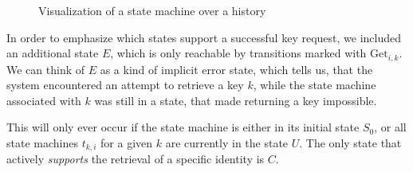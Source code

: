 \begin{figure}[h]
    \centering
    \caption{Visualization of a state machine over a history}
\end{figure}

In order to emphasize which states support a successful key request, we included an additional state \(E\), which is only reachable by transitions marked with \(\text{Get}_{i,k}\). We can think of \(E\) as a kind of implicit error state, which tells us, that the system encountered an attempt to retrieve a key \(k\), while the state machine associated with \(k\) was still in a state, that made returning a key impossible. 

This will only ever occur if the state machine is either in its initial state \(S_0\), or all state machines \(t_{k,i}\) for a given \(k\) are currently in the state \(U\).
The only state that actively \emph{supports} the retrieval of a specific identity is \(C\).
